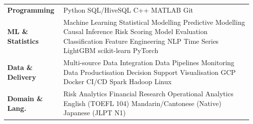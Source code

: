 \documentclass[a4paper,10pt]{article}
\begin{document}
\begin{tabular}{@{}p{3.0cm}p{12.5cm}@{}}
\textbf{Programming} & Python \textperiodcentered{} SQL/HiveSQL \textperiodcentered{} C++ \textperiodcentered{} MATLAB \textperiodcentered{} Git \\[1pt]
\textbf{ML \& Statistics} & Machine Learning \textperiodcentered{} Statistical Modelling \textperiodcentered{} Predictive Modelling \textperiodcentered{} Causal Inference \textperiodcentered{} Risk Scoring \textperiodcentered{} Model Evaluation \textperiodcentered{} Classification \textperiodcentered{} Feature Engineering \textperiodcentered{} NLP \textperiodcentered{} Time Series \textperiodcentered{} LightGBM \textperiodcentered{} scikit-learn \textperiodcentered{} PyTorch \\[1pt]
\textbf{Data \& Delivery} & Multi-source Data Integration \textperiodcentered{} Data Pipelines \textperiodcentered{} Monitoring \textperiodcentered{} Data Productisation \textperiodcentered{} Decision Support \textperiodcentered{} Visualisation \textperiodcentered{} GCP \textperiodcentered{} Docker \textperiodcentered{} CI/CD \textperiodcentered{} Spark \textperiodcentered{} Hadoop \textperiodcentered{} Linux \\[1pt]
\textbf{Domain \& Lang.} & Risk Analytics \textperiodcentered{} Financial Research \textperiodcentered{} Operational Analytics \textperiodcentered{} English (TOEFL 104) \textperiodcentered{} Mandarin/Cantonese (Native) \textperiodcentered{} Japanese (JLPT N1) \\
\end{tabular}
\end{document}
